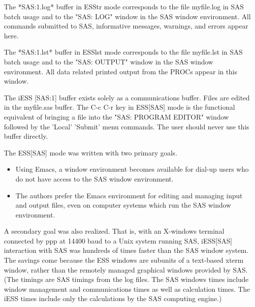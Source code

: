 \documentclass{article}
\begin{document}
The *SAS:1.log* buffer in ESStr mode corresponds to the file
myfile.log in SAS batch usage and to the "SAS: LOG" window in the SAS
window environment.  All commands submitted to SAS, informative
messages, warnings, and errors appear here.

The *SAS:1.lst* buffer in ESSlst mode corresponds to the file
myfile.lst in SAS batch usage and to the "SAS: OUTPUT" window in the
SAS window environment.  All data related printed output from the
PROCs appear in this window.

The iESS [SAS:1] buffer exists solely as a communications buffer.
Files are edited in the myfile.sas buffer.  The C-c C-r key in
ESS[SAS] mode is the functional equivalent of bringing a file into the
"SAS: PROGRAM EDITOR" window followed by the 'Local' 'Submit' menu
commands.  The user should never use this buffer directly.

The ESS[SAS] mode was written with two primary goals.
\begin{itemize}
\item Using Emacs, a window environment becomes available for dial-up
  users who do not have access to the SAS window environment.
\item The authors prefer the Emacs environment for editing and
  managing input and output files, even on computer systems which run
  the SAS window environment.
\end{itemize}
A secondary goal was also realized.  That is, with an X-windows
terminal connected by ppp at 14400 baud to a Unix system running SAS,
iESS[SAS] interaction with SAS was hundreds of times faster than the
SAS window system.  The savings come because the ESS windows are
subunits of a text-based xterm window, rather than the remotely
managed graphical windows provided by SAS.  (The timings are SAS
timings from the log files.  The SAS windows times include window
management and communications times as well as calculation times.  The
iESS times include only the calculations by the SAS computing engine.)



\end{document}
